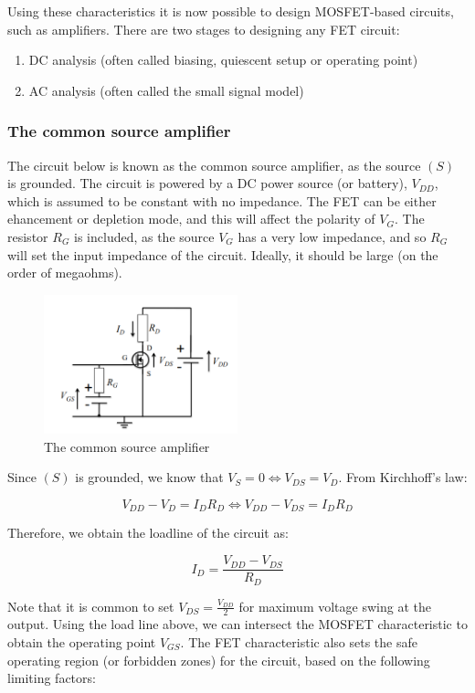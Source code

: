 \documentclass{article}
\begin{document}
Using these characteristics it is now possible to design MOSFET-based circuits, such as amplifiers. There are two stages to designing any FET circuit:

\begin{enumerate}
    \item DC analysis (often called biasing, quiescent setup or operating point)
    \item AC analysis (often called the small signal model)
\end{enumerate}

\subsubsection{The common source amplifier}

The circuit below is known as the common source amplifier, as the source $(S)$ is grounded. The circuit is powered by a DC power source (or battery), $V_{DD}$, which is assumed to be constant with no impedance. The FET can be either ehancement or depletion mode, and this will affect the polarity of $V_G$. The resistor $R_G$ is included, as the source $V_G$ has a very low impedance, and so $R_G$ will set the input impedance of the circuit. Ideally, it should be large (on the order of megaohms).

\newpage

\begin{figure}[h]
    \centering
    \includegraphics[width = 0.5\textwidth]{images/fet4.png}
    \caption{The common source amplifier}
    \label{fig:enter-label}
\end{figure}

Since $(S)$ is grounded, we know that $V_S = 0 \iff V_{DS} = V_D$. From Kirchhoff's law:

\[ V_{DD} - V_D = I_DR_D \iff V_{DD} - V_{DS} = I_DR_D \]

Therefore, we obtain the loadline of the circuit as:

\[ I_D = \frac{V_{DD} - V_{DS}}{R_D} \]

Note that it is common to set $V_{DS} = \frac{V_{DD}}{2}$ for maximum voltage swing at the output. Using the load line above, we can intersect the MOSFET characteristic to obtain the operating point $V_{GS}$. The FET characteristic also sets the safe operating region (or forbidden zones) for the circuit, based on the following limiting factors:
\end{document}
